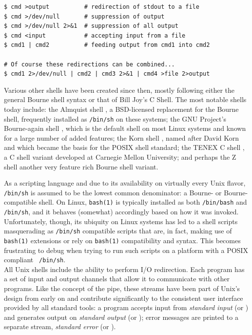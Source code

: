 \begin{lstlisting}[float,label=code:io-redir,caption=Simple I/O redirection in the shell]
$ cmd >output          # redirection of stdout to a file
$ cmd >/dev/null       # suppression of output
$ cmd >/dev/null 2>&1  # suppression of all output
$ cmd <input           # accepting input from a file
$ cmd1 | cmd2          # feeding output from cmd1 into cmd2

# Of course these redirections can be combined...
$ cmd1 2>/dev/null | cmd2 | cmd3 2>&1 | cmd4 >file 2>output
\end{lstlisting}


Various other shells have been created since then,
mostly following either the general Bourne shell
syntax or that of Bill Joy's C
 Shell.  The most notable shells today
include: the Almquist shell , a
BSD-licensed replacement for the Bourne shell,
frequently installed as {\tt /bin/sh} on these
systems; the GNU Project's Bourne-again
shell ,
which is the default shell on most Linux systems and
known for a large number of added features; the Korn
shell , named after David
Korn and which became the
basis for the POSIX shell standard; the TENEX C shell
, a C shell variant developed at
Carnegie Mellon University; and perhaps the Z shell
 another very feature rich Bourne
shell variant.

As a scripting language and due to its availability on
virtually every Unix flavor, {\tt /bin/sh} is assumed
to be the lowest common denominator: a Bourne- or
Bourne-compatible shell.  On Linux, {\tt bash(1)} is
typically installed as both {\tt /bin/bash} and {\tt
/bin/sh}, and it behaves (somewhat) accordingly based
on how it was invoked.  Unfortunately, though, its
ubiquity on Linux systems has led to a shell scripts
masquerading as {\tt /bin/sh} compatible scripts that
are, in fact, making use of {\tt bash(1)} extensions
or rely on {\tt bash(1)} compatibility and syntax.
This becomes frustrating to debug when trying to run
such scripts on a platform with a POSIX compliant {\tt
/bin/sh}.  \\

All Unix shells include the ability to perform  I/O
redirection.  Each program has
a set of input and output channels that allow it to
communicate with other programs.  Like the concept of
the pipe, these streams have been part of Unix's
design from early on and contribute significantly to
the consistent user interface provided by all standard
tools:  a program accepts input from {\em standard
input} (or ) and generates output on
{\em standard output} (or ); error
messages are printed to a separate stream, {\em
standard error} (or ).

